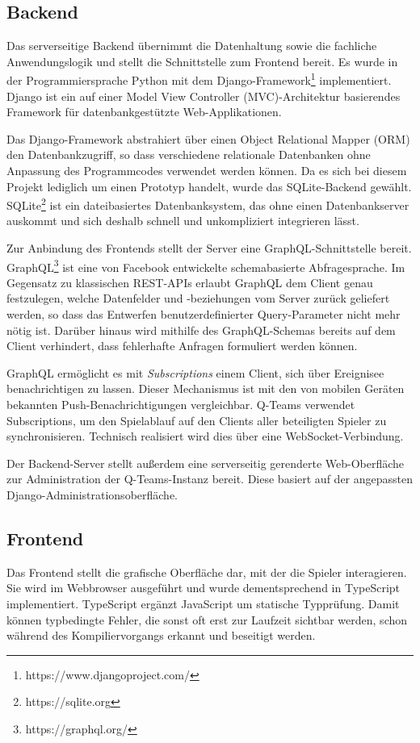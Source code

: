 \documentclass[a4paper,11pt,listof=numbered,glossary=totoc,parskip=half,toc=bib]{scrreprt}
\begin{document}
		\subsection{Backend}
	\label{subsec:backend}
	Das serverseitige Backend übernimmt die Datenhaltung sowie die fachliche Anwendungslogik und stellt die Schnittstelle zum Frontend bereit. Es wurde in der Programmiersprache Python mit dem Django-Framework\footnote{https://www.djangoproject.com/} implementiert. Django ist ein auf einer \frqq{}Model View Controller (MVC)\flqq{}-Architektur basierendes Framework für datenbankgestützte Web-Applikationen.
	
	Das Django-Framework abstrahiert über einen Object Relational Mapper (ORM) den Datenbankzugriff, so dass verschiedene relationale Datenbanken ohne Anpassung des Programmcodes verwendet werden können. Da es sich bei diesem Projekt lediglich um einen Prototyp handelt, wurde das SQLite-Backend gewählt. SQLite\footnote{https://sqlite.org} ist ein dateibasiertes Datenbanksystem, das ohne einen Datenbankserver auskommt und sich deshalb schnell und unkompliziert integrieren lässt.
	
	Zur Anbindung des Frontends stellt der Server eine GraphQL-Schnittstelle bereit. GraphQL\footnote{https://graphql.org/} ist eine von Facebook entwickelte schemabasierte Abfragesprache. Im Gegensatz zu klassischen REST-APIs erlaubt GraphQL dem Client genau festzulegen, welche Datenfelder und -beziehungen vom Server zurück geliefert werden, so dass das Entwerfen benutzerdefinierter Query-Parameter nicht mehr nötig ist. Darüber hinaus wird mithilfe des GraphQL-Schemas bereits auf dem Client verhindert, dass fehlerhafte Anfragen formuliert werden können.
	
	GraphQL ermöglicht es mit \textit{Subscriptions} einem Client, sich über Ereignisee benachrichtigen zu lassen. Dieser Mechanismus ist mit den von mobilen Geräten bekannten Push-Benachrichtigungen vergleichbar. Q-Teams verwendet Subscriptions, um den Spielablauf auf den Clients aller beteiligten Spieler zu synchronisieren. Technisch realisiert wird dies über eine WebSocket-Verbindung.

	Der Backend-Server stellt außerdem eine serverseitig gerenderte Web-Oberfläche zur Administration der Q-Teams-Instanz bereit. Diese basiert auf der angepassten Django-Administrationsoberfläche.
	
	\subsection{Frontend}
	Das Frontend stellt die grafische Oberfläche dar, mit der die Spieler interagieren. Sie wird im Webbrowser ausgeführt und wurde dementsprechend in TypeScript implementiert. TypeScript ergänzt JavaScript um statische Typprüfung. Damit können typbedingte Fehler, die sonst oft erst zur Laufzeit sichtbar werden, schon während des Kompiliervorgangs erkannt und beseitigt werden. 
	
\end{document}
